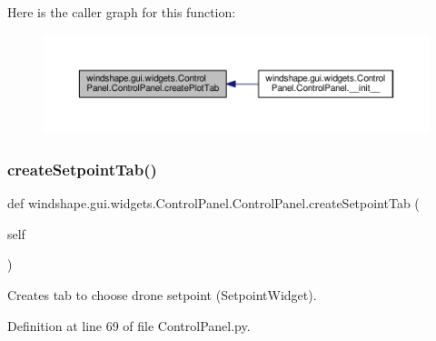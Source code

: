 Here is the caller graph for this function\+:\nopagebreak
\begin{figure}[H]
\begin{center}
\leavevmode
\includegraphics[width=350pt]{classwindshape_1_1gui_1_1widgets_1_1_control_panel_1_1_control_panel_a399541328b581ef0ba6a56fa7309b3d4_icgraph}
\end{center}
\end{figure}
\mbox{\label{classwindshape_1_1gui_1_1widgets_1_1_control_panel_1_1_control_panel_a737c867fe353e2aa44e064cd46633d21}} 
\subsubsection{\texorpdfstring{create\+Setpoint\+Tab()}{createSetpointTab()}}
{\footnotesize\ttfamily def windshape.\+gui.\+widgets.\+Control\+Panel.\+Control\+Panel.\+create\+Setpoint\+Tab (\begin{DoxyParamCaption}\item[{}]{self }\end{DoxyParamCaption})}

\begin{DoxyVerb}Creates tab to choose drone setpoint (SetpointWidget).\end{DoxyVerb}
 

Definition at line 69 of file Control\+Panel.\+py.


